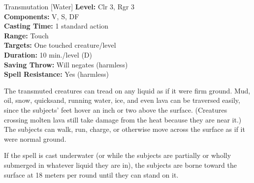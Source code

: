 {Transmutation [Water]}
{
	\textbf{Level:}
	Clr 3, Rgr 3\\
	\textbf{Components:}
	V, S, DF\\
	\textbf{Casting Time:}
	1 standard action\\
	\textbf{Range:}
	Touch\\
	\textbf{Targets:}
	One touched creature/level\\
	\textbf{Duration:}
	10 min./level (D)\\
	\textbf{Saving Throw:}
	Will negates (harmless)\\
	\textbf{Spell Resistance:}
	Yes (harmless)\\
}
{
	The transmuted creatures can tread on any liquid as if it were firm ground. Mud, oil, snow, quicksand, running water, ice, and even lava can be traversed easily, since the subjects' feet hover an inch or two above the surface. (Creatures crossing molten lava still take damage from the heat because they are near it.) The subjects can walk, run, charge, or otherwise move across the surface as if it were normal ground.

	If the spell is cast underwater (or while the subjects are partially or wholly submerged in whatever liquid they are in), the subjects are borne toward the surface at 18 meters per round until they can stand on it.

}
